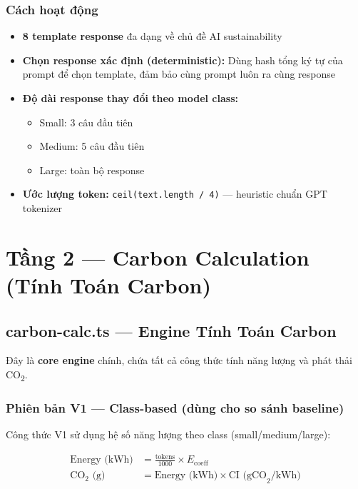 \documentclass[12pt,a4paper]{article}
\begin{document}
\subsubsection{Cách hoạt động}
\begin{itemize}
    \item \textbf{8 template response} đa dạng về chủ đề AI sustainability
    \item \textbf{Chọn response xác định (deterministic):} Dùng hash tổng ký tự của prompt để chọn template, đảm bảo cùng prompt luôn ra cùng response
    \item \textbf{Độ dài response thay đổi theo model class:}
    \begin{itemize}
        \item Small: 3 câu đầu tiên
        \item Medium: 5 câu đầu tiên
        \item Large: toàn bộ response
    \end{itemize}
    \item \textbf{Ước lượng token:} \texttt{ceil(text.length / 4)} — heuristic chuẩn GPT tokenizer
\end{itemize}

\section{Tầng 2 — Carbon Calculation (Tính Toán Carbon)}

\subsection{carbon-calc.ts — Engine Tính Toán Carbon}

Đây là \textbf{core engine} chính, chứa tất cả công thức tính năng lượng và phát thải CO\textsubscript{2}.

\subsubsection{Phiên bản V1 — Class-based (dùng cho so sánh baseline)}

Công thức V1 sử dụng hệ số năng lượng theo class (small/medium/large):

\begin{align}
    \text{Energy (kWh)} &= \frac{\text{tokens}}{1000} \times E_{\text{coeff}} \\
    \text{CO}_2 \text{ (g)} &= \text{Energy (kWh)} \times \text{CI (gCO}_2\text{/kWh)}
\end{align}
\end{document}
